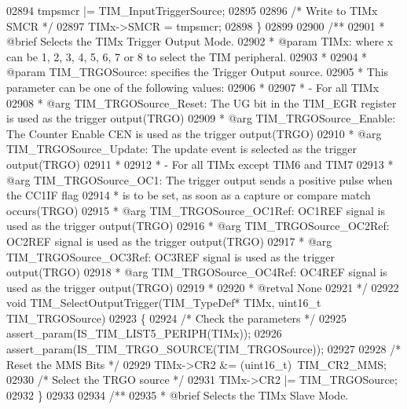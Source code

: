 \begin{DoxyCode}
02894   tmpsmcr |= TIM\_InputTriggerSource;
02895 
02896   \textcolor{comment}{/* Write to TIMx SMCR */}
02897   TIMx->SMCR = tmpsmcr;
02898 \}
02899 
02900 \textcolor{comment}{/**}
02901 \textcolor{comment}{  * @brief  Selects the TIMx Trigger Output Mode.}
02902 \textcolor{comment}{  * @param  TIMx: where x can be 1, 2, 3, 4, 5, 6, 7 or 8 to select the TIM peripheral.}
02903 \textcolor{comment}{  *     }
02904 \textcolor{comment}{  * @param  TIM\_TRGOSource: specifies the Trigger Output source.}
02905 \textcolor{comment}{  *   This parameter can be one of the following values:}
02906 \textcolor{comment}{  *}
02907 \textcolor{comment}{  *  - For all TIMx}
02908 \textcolor{comment}{  *            @arg TIM\_TRGOSource\_Reset:  The UG bit in the TIM\_EGR register is used as the trigger
       output(TRGO)}
02909 \textcolor{comment}{  *            @arg TIM\_TRGOSource\_Enable: The Counter Enable CEN is used as the trigger output(TRGO)}
02910 \textcolor{comment}{  *            @arg TIM\_TRGOSource\_Update: The update event is selected as the trigger output(TRGO)}
02911 \textcolor{comment}{  *}
02912 \textcolor{comment}{  *  - For all TIMx except TIM6 and TIM7}
02913 \textcolor{comment}{  *            @arg TIM\_TRGOSource\_OC1: The trigger output sends a positive pulse when the CC1IF flag}
02914 \textcolor{comment}{  *                                     is to be set, as soon as a capture or compare match
       occurs(TRGO)}
02915 \textcolor{comment}{  *            @arg TIM\_TRGOSource\_OC1Ref: OC1REF signal is used as the trigger output(TRGO)}
02916 \textcolor{comment}{  *            @arg TIM\_TRGOSource\_OC2Ref: OC2REF signal is used as the trigger output(TRGO)}
02917 \textcolor{comment}{  *            @arg TIM\_TRGOSource\_OC3Ref: OC3REF signal is used as the trigger output(TRGO)}
02918 \textcolor{comment}{  *            @arg TIM\_TRGOSource\_OC4Ref: OC4REF signal is used as the trigger output(TRGO)}
02919 \textcolor{comment}{  *}
02920 \textcolor{comment}{  * @retval None}
02921 \textcolor{comment}{  */}
02922 \textcolor{keywordtype}{void} TIM_SelectOutputTrigger(TIM\_TypeDef* TIMx, uint16\_t TIM\_TRGOSource)
02923 \{
02924   \textcolor{comment}{/* Check the parameters */}
02925   assert_param(IS\_TIM\_LIST5\_PERIPH(TIMx));
02926   assert_param(IS\_TIM\_TRGO\_SOURCE(TIM\_TRGOSource));
02927 
02928   \textcolor{comment}{/* Reset the MMS Bits */}
02929   TIMx->CR2 &= (uint16\_t)~TIM_CR2_MMS;
02930   \textcolor{comment}{/* Select the TRGO source */}
02931   TIMx->CR2 |=  TIM\_TRGOSource;
02932 \}
02933 
02934 \textcolor{comment}{/**}
02935 \textcolor{comment}{  * @brief  Selects the TIMx Slave Mode.}

\end{DoxyCode}
